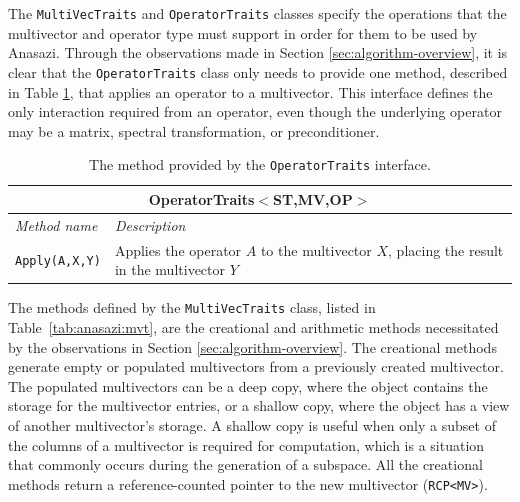 \documentclass[acmtoms,acmnow]{acmtrans2m}
\newcommand{\aspace}[1]{\texttt{#1}}
\begin{document}
The \aspace{MultiVecTraits} and \aspace{OperatorTraits} classes specify
the operations that the multivector and operator type must support in order for them to be
used by Anasazi. Through the observations made in Section \ref{sec:algorithm-overview}, 
it is clear that the \aspace{OperatorTraits} class only needs to provide one method,
described in Table \ref{tab:anasazi:opt}, that applies an operator to a multivector.  
This interface defines the only interaction required from an operator, even though
the underlying operator may be a matrix, 
spectral transformation, or preconditioner.
\begin{table}[bth]
\begin{center}
  \caption{The method provided by the \aspace{OperatorTraits} interface.}
\label{tab:anasazi:opt}
\begin{tabular}{| p{4cm} | p{8cm} |}
\hline
\multicolumn{2}{|c|}{\textbf{OperatorTraits$<$ST,MV,OP$>$}} \\\hline
\emph{Method name} & \emph{Description} \\\hline
{\tt Apply(A,X,Y)} & Applies the operator $A$ to the multivector $X$, placing the
result in the multivector $Y$ \\
\hline
\end{tabular}
\end{center}
\end{table}

The methods defined by the \aspace{MultiVecTraits} class, listed in
Table~\ref{tab:anasazi:mvt}, are the creational and arithmetic methods necessitated
by the observations in Section \ref{sec:algorithm-overview}.
The creational methods generate empty or populated multivectors from a previously
created multivector. The populated multivectors can be 
a deep copy, where the object contains the storage for the multivector entries, or a shallow copy, 
where the object has a view of another multivector's storage.
A shallow copy is useful when only a
subset of the columns of a multivector is required for computation, which is a situation that 
commonly occurs during the generation of a subspace. All the creational methods return
a reference-counted pointer \cite{Detlefs:1992:GCR,Teuchos-RCP} to the new multivector (\aspace{RCP<MV>}). 

\end{document}
